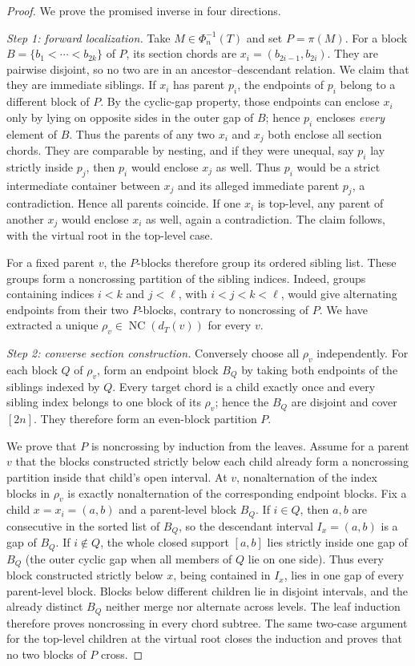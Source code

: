 \documentclass[10pt,a4paper]{amsart}
\theoremstyle{definition}
\theoremstyle{remark}
\newcommand{\NC}{\operatorname{NC}}
\begin{document}
\begin{proof}
We prove the promised inverse in four directions.

\smallskip
\noindent\emph{Step 1: forward localization.}
Take $M\in\Phi_n^{-1}(T)$ and set $P=\pi(M)$.  For a block
$B=\{b_1<\cdots<b_{2k}\}$ of $P$, its section chords are
$x_i=(b_{2i-1},b_{2i})$.  They are pairwise disjoint, so no two are in an
ancestor--descendant relation.  We claim that they are immediate siblings.
If $x_i$ has parent $p_i$, the endpoints of $p_i$ belong to a different
block of $P$.  By the cyclic-gap property, those endpoints can enclose $x_i$
only by lying on opposite sides in the outer gap of $B$; hence $p_i$ encloses
\emph{every} element of $B$.  Thus the parents of any two $x_i$ and $x_j$
both enclose all section chords.  They are comparable by nesting, and if
they were unequal, say $p_i$ lay strictly inside $p_j$, then $p_i$ would
enclose $x_j$ as well.  Thus $p_i$ would be a strict intermediate container
between $x_j$ and its alleged immediate parent $p_j$, a contradiction.
Hence all parents coincide.  If one $x_i$ is top-level, any parent of
another $x_j$ would enclose $x_i$ as well, again a contradiction.  The
claim follows, with the virtual root in the top-level case.

For a fixed parent $v$, the $P$-blocks therefore group its ordered sibling
list.  These groups form a noncrossing partition of the sibling indices.
Indeed, groups containing indices $i<k$ and $j<\ell$, with
$i<j<k<\ell$, would give alternating endpoints from their two $P$-blocks,
contrary to noncrossing of $P$.  We have extracted a unique
$\rho_v\in\NC(d_T(v))$ for every $v$.

\smallskip
\noindent\emph{Step 2: converse section construction.}
Conversely choose all $\rho_v$ independently.  For each block $Q$ of
$\rho_v$, form an endpoint block $B_Q$ by taking both endpoints of the
siblings indexed by $Q$.  Every target chord is a child exactly once and
every sibling index belongs to one block of its $\rho_v$; hence the $B_Q$
are disjoint and cover $[2n]$.  They therefore form an even-block partition
$P$.

We prove that $P$ is noncrossing by induction from the leaves.  Assume for a
parent $v$ that the blocks constructed strictly below each child already
form a noncrossing partition inside that child's open interval.  At $v$,
nonalternation of the index blocks in $\rho_v$ is exactly nonalternation of
the corresponding endpoint blocks.  Fix a child
$x=x_i=(a,b)$ and a parent-level block $B_Q$.  If $i\in Q$, then $a,b$
are consecutive in the sorted list of $B_Q$, so the descendant interval
$I_x=(a,b)$ is a gap of $B_Q$.  If $i\notin Q$, the whole closed support
$[a,b]$ lies strictly inside one gap of $B_Q$ (the outer cyclic gap when all
members of $Q$ lie on one side).  Thus every block constructed strictly
below $x$, being contained in $I_x$, lies in one gap of every parent-level
block.  Blocks below different children lie in disjoint intervals, and the
already distinct $B_Q$ neither merge nor alternate across levels.  The leaf
induction therefore proves noncrossing in every chord subtree.  The same
two-case argument for the top-level children at the virtual root closes the
induction and proves that no two blocks of $P$ cross.


\end{proof}
\end{document}
